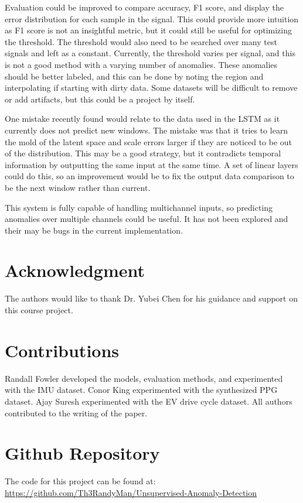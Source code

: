 \documentclass[conference]{IEEEtran}
\begin{document}
Evaluation could be improved to compare accuracy, F1 score, and display the error distribution for each sample in the signal. This could provide more intuition as F1 score is not an insightful metric, but it could still be useful for optimizing the threshold. The threshold would also need to be searched over many test signals and left as a constant. Currently, the threshold varies per signal, and this is not a good method with a varying number of anomalies. These anomalies should be better labeled, and this can be done by noting the region and interpolating if starting with dirty data. Some datasets will be difficult to remove or add artifacts, but this could be a project by itself.

One mistake recently found would relate to the data used in the LSTM as it currently does not predict new windows. The mistake was that it tries to learn the mold of the latent space and scale errors larger if they are noticed to be out of the distribution. This may be a good strategy, but it contradicts temporal information by outputting the same input at the same time. A set of linear layers could do this, so an improvement would be to fix the output data comparison to be the next window rather than current.

This system is fully capable of handling multichannel inputs, so predicting anomalies over multiple channels could be useful. It has not been explored and their may be bugs in the current implementation.


\section*{Acknowledgment}
The authors would like to thank Dr. Yubei Chen for his guidance and support on this course project.

\section*{Contributions}
Randall Fowler developed the models, evaluation methods, and experimented with the IMU dataset. 
Conor King experimented with the synthesized PPG dataset. 
Ajay Suresh experimented with the EV drive cycle dataset. 
All authors contributed to the writing of the paper.

\section*{Github Repository}
The code for this project can be found at: \url{https://github.com/Th3RandyMan/Unsupervised-Anomaly-Detection}
\end{document}
